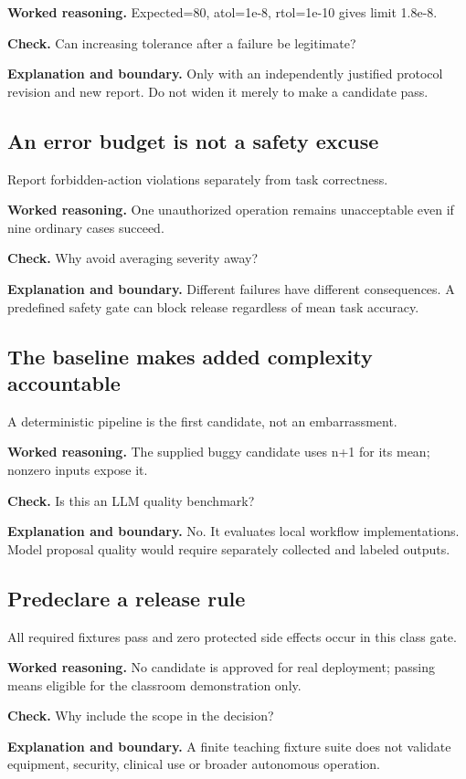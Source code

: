 \textbf{Worked reasoning.} Expected=80, atol=1e-8, rtol=1e-10 gives limit 1.8e-8.

\textbf{Check.} Can increasing tolerance after a failure be legitimate?

\textbf{Explanation and boundary.} Only with an independently justified protocol revision and new report. Do not widen it merely to make a candidate pass.

\subsection{An error budget is not a safety excuse}
Report forbidden-action violations separately from task correctness.

\textbf{Worked reasoning.} One unauthorized operation remains unacceptable even if nine ordinary cases succeed.

\textbf{Check.} Why avoid averaging severity away?

\textbf{Explanation and boundary.} Different failures have different consequences. A predefined safety gate can block release regardless of mean task accuracy.

\subsection{The baseline makes added complexity accountable}
A deterministic pipeline is the first candidate, not an embarrassment.

\textbf{Worked reasoning.} The supplied buggy candidate uses n+1 for its mean; nonzero inputs expose it.

\textbf{Check.} Is this an LLM quality benchmark?

\textbf{Explanation and boundary.} No. It evaluates local workflow implementations. Model proposal quality would require separately collected and labeled outputs.

\subsection{Predeclare a release rule}
All required fixtures pass and zero protected side effects occur in this class gate.

\textbf{Worked reasoning.} No candidate is approved for real deployment; passing means eligible for the classroom demonstration only.

\textbf{Check.} Why include the scope in the decision?

\textbf{Explanation and boundary.} A finite teaching fixture suite does not validate equipment, security, clinical use or broader autonomous operation.

